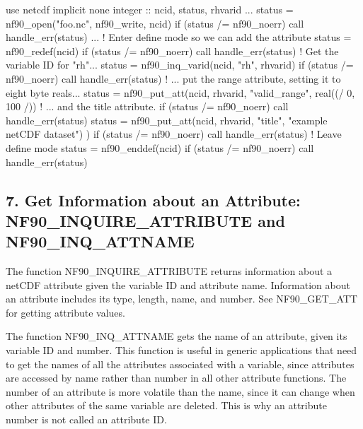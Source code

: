 \begin{DoxyCode}
\textcolor{keywordtype}{use }netcdf
\textcolor{keywordtype}{implicit none}
\textcolor{keywordtype}{integer} :: ncid, status, rhvarid
...
status = nf90\_open(\textcolor{stringliteral}{"foo.nc"}, nf90\_write, ncid)
\textcolor{keywordflow}{if} (status /= nf90\_noerr) \textcolor{keyword}{call }handle\_err(status)
...
\textcolor{comment}{! Enter define mode so we can add the attribute}
status = nf90\_redef(ncid)
\textcolor{keywordflow}{if} (status /= nf90\_noerr) \textcolor{keyword}{call }handle\_err(status)
\textcolor{comment}{! Get the variable ID for "rh"...}
status = nf90\_inq\_varid(ncid, \textcolor{stringliteral}{"rh"}, rhvarid)
\textcolor{keywordflow}{if} (status /= nf90\_noerr) \textcolor{keyword}{call }handle\_err(status)
\textcolor{comment}{! ...  put the range attribute, setting it to eight byte reals...}
status = nf90\_put\_att(ncid, rhvarid, \textcolor{stringliteral}{"valid\_range"}, \textcolor{keywordtype}{real}((/ 0, 100 /))
\textcolor{comment}{! ... and the title attribute.}
\textcolor{keywordflow}{if} (status /= nf90\_noerr) \textcolor{keyword}{call }handle\_err(status)
status = nf90\_put\_att(ncid, rhvarid, \textcolor{stringliteral}{"title"}, \textcolor{stringliteral}{"example netCDF dataset"}) )
\textcolor{keywordflow}{if} (status /= nf90\_noerr) \textcolor{keyword}{call }handle\_err(status)
\textcolor{comment}{! Leave define mode}
status = nf90\_enddef(ncid)
\textcolor{keywordflow}{if} (status /= nf90\_noerr) \textcolor{keyword}{call }handle\_err(status)
\end{DoxyCode}
\hypertarget{f90-attributes_f90-get-information-about-an-attribute-nf90_inquire_attribute-and-nf90_inq_attname}{}\subsection{7. Get Information about an Attribute\+: N\+F90\+\_\+\+I\+N\+Q\+U\+I\+R\+E\+\_\+\+A\+T\+T\+R\+I\+B\+U\+T\+E and N\+F90\+\_\+\+I\+N\+Q\+\_\+\+A\+T\+T\+N\+A\+M\+E }\label{f90-attributes_f90-get-information-about-an-attribute-nf90_inquire_attribute-and-nf90_inq_attname}
The function N\+F90\+\_\+\+I\+N\+Q\+U\+I\+R\+E\+\_\+\+A\+T\+T\+R\+I\+B\+U\+TE returns information about a net\+C\+DF attribute given the variable ID and attribute name. Information about an attribute includes its type, length, name, and number. See N\+F90\+\_\+\+G\+E\+T\+\_\+\+A\+TT for getting attribute values.

The function N\+F90\+\_\+\+I\+N\+Q\+\_\+\+A\+T\+T\+N\+A\+ME gets the name of an attribute, given its variable ID and number. This function is useful in generic applications that need to get the names of all the attributes associated with a variable, since attributes are accessed by name rather than number in all other attribute functions. The number of an attribute is more volatile than the name, since it can change when other attributes of the same variable are deleted. This is why an attribute number is not called an attribute ID.

